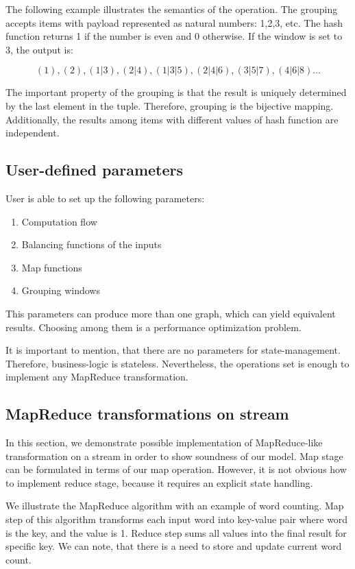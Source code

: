 The following example illustrates the semantics of the operation. The grouping accepts items with payload represented as natural numbers: 1,2,3, etc. The hash function returns 1 if the number is even and 0 otherwise. If the window is set to 3, the output is:

\[(1), (2), (1|3), (2|4), (1|3|5), (2|4|6), (3|5|7), (4|6|8)...\]

The important property of the grouping is that the result is uniquely determined by the last element in the tuple. Therefore, grouping is the bijective mapping. Additionally, the results among items with different values of hash function are independent.

\subsection{User-defined parameters}

User is able to set up the following parameters:

\begin{enumerate}
  \item{Computation flow}
  \item{Balancing functions of the inputs}
  \item{Map functions}
  \item{Grouping windows}
\end{enumerate}

This parameters can produce more than one graph, which can yield equivalent results. Choosing among them is a performance optimization problem.    

It is important to mention, that there are no parameters for state-management. Therefore, business-logic is stateless. Nevertheless, the operations set is enough to implement any MapReduce transformation.

\subsection{MapReduce transformations on stream}

In this section, we demonstrate possible implementation of MapReduce-like transformation on a stream in order to show soundness of our model. Map stage can be formulated in terms of our map operation. However, it is not obvious how to implement reduce stage, because it requires an explicit state handling. 

We illustrate the MapReduce algorithm with an example of word counting. Map step of this algorithm transforms each input word into key-value pair where word is the key, and the value is 1. Reduce step sums all values into the final result for specific key. We can note, that there is a need to store and update current word count.


